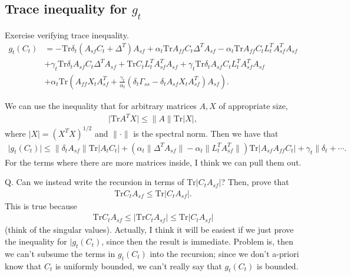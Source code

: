 

\subsection{Trace inequality for $g_t$}
{\color{red}Exercise verifying trace inequality.}
\begin{align*}
    g_t (C_t) &= 
    -\mathrm{Tr}\delta_t \left( A_{sf} C_t + \Delta^T \right) A_{sf}
    + 
    \alpha_t \mathrm{Tr} A_{ff} C_t \Delta^T  A_{sf}
    - \alpha_t \mathrm{Tr} A_{ff} C_t L_t^T A_{sf}^T A_{sf}
    \\ & 
    + \gamma_t \mathrm{Tr} \delta_t A_{sf} C_t \Delta^T A_{sf}
    + \mathrm{Tr} C_t L_t^T A_{sf}^T A_{sf}
    + \gamma_t \mathrm{Tr} \delta_t A_{sf} C_t L_t^T A_{sf}^T A_{sf}
    \\ &
    + \alpha_t \mathrm{Tr} \left(A_{ff} X_t A_{sf}^T 
    + \frac{\gamma_t}{\alpha_t} \left(\delta_t \Gamma_{ss} - \delta_t A_{sf} X_t A_{sf}^T \right) A_{sf}\right) .
\end{align*}


We can use the inequality that for arbitrary matrices $A, X$ of appropriate size, 
\begin{align*}
    \lvert \mathrm{Tr} A^T X \rvert \leq \lVert A \rVert \mathrm{Tr} \lvert X \rvert ,
\end{align*}
where $\lvert X \rvert = (X^T X)^{1/2}$ and $\lVert \cdot \rVert$ is the spectral norm.
Then we have that 
\begin{align*}
    \lvert g_t (C_t) \rvert \leq 
    \lVert \delta_t A_{sf} \rVert \mathrm{Tr} \lvert A_t C_t \rvert 
    + 
    \left(
        \alpha_t \lVert \Delta^T A_{sf} \rVert 
        - \alpha_t \lVert L_t^T A_{sf}^T \rVert 
    \right)
    \mathrm{Tr} \lvert A_{sf} A_{ff} C_t \rvert
    + \gamma_t \lVert \delta_t + \cdots .
\end{align*}
For the terms where there are more matrices inside, I think we can pull them out. 


Q. 
Can we instead write the recursion in terms of $\mathrm{Tr} \lvert C_t A_{sf} \rvert$?
Then, prove that 
\begin{align*}
    \mathrm{Tr} C_t A_{sf} \leq \mathrm{Tr} \lvert C_t A_{sf} \rvert .
\end{align*}
This is true because
\begin{align*}
    \mathrm{Tr} C_t A_{sf} \leq \lvert \mathrm{Tr} C_t A_{sf} \rvert \leq \mathrm{Tr} \lvert C_t A_{sf} \rvert
\end{align*}
(think of the singular values).
{\color{red}Actually, I think it will be easiest if we just prove the inequality for $\lvert g_t (C_t)$, since then the result is immediate.
Problem is, then we can't subsume the terms in $g_t (C_t)$ into the recursion; since we don't a-priori know that $C_t$ is uniformly bounded, we can't really say that $g_t (C_t)$ is bounded. 
}

